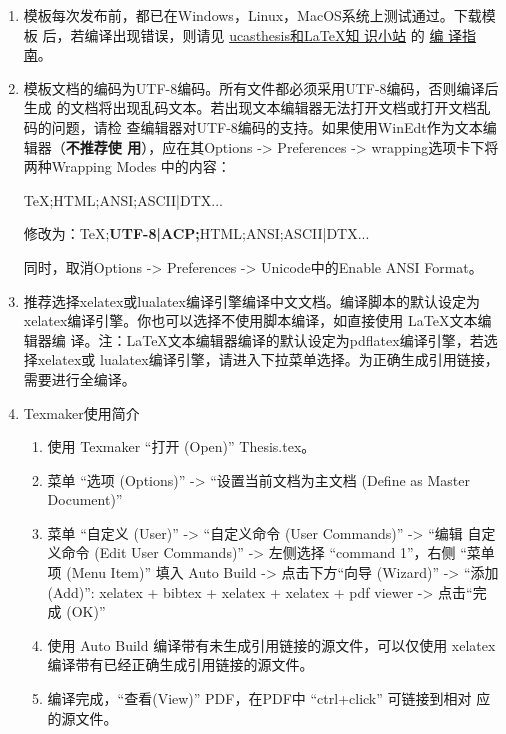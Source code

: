 \begin{enumerate}
    \item 模板每次发布前，都已在Windows，Linux，MacOS系统上测试通过。下载模板
    后，若编译出现错误，则请见
    \href{https://github.com/mohuangrui/ucasthesis/wiki}{ucasthesis和\LaTeX{}知
    识小站} 的
    \href{https://github.com/mohuangrui/ucasthesis/wiki/%E7%BC%96%E8%AF%91%E6%8C%87%E5%8D%97}{编
    译指南}。

    \item 模板文档的编码为UTF-8编码。所有文件都必须采用UTF-8编码，否则编译后生成
    的文档将出现乱码文本。若出现文本编辑器无法打开文档或打开文档乱码的问题，请检
    查编辑器对UTF-8编码的支持。如果使用WinEdt作为文本编辑器（\textbf{不推荐使
    用}），应在其Options -> Preferences -> wrapping选项卡下将两种Wrapping Modes
    中的内容：
        
        TeX;HTML;ANSI;ASCII|DTX...
        
        修改为：TeX;\textbf{UTF-8|ACP;}HTML;ANSI;ASCII|DTX...
        
        同时，取消Options -> Preferences -> Unicode中的Enable ANSI Format。

    \item 推荐选择xelatex或lualatex编译引擎编译中文文档。编译脚本的默认设定为
    xelatex编译引擎。你也可以选择不使用脚本编译，如直接使用 \LaTeX{}文本编辑器编
    译。注：\LaTeX{}文本编辑器编译的默认设定为pdflatex编译引擎，若选择xelatex或
    lualatex编译引擎，请进入下拉菜单选择。为正确生成引用链接，需要进行全编译。

    \item Texmaker使用简介
        \begin{enumerate}
            \footnotesize
            \item 使用 Texmaker “打开 (Open)” Thesis.tex。
            \item 菜单 “选项 (Options)” -> “设置当前文档为主文档 (Define as
            Master Document)”
            \item 菜单 “自定义 (User)” -> “自定义命令 (User Commands)” -> “编辑
            自定义命令 (Edit User Commands)” -> 左侧选择 “command 1”，右侧 “菜单
            项 (Menu Item)” 填入 Auto Build -> 点击下方“向导 (Wizard)” -> “添加
            (Add)”: xelatex + bibtex + xelatex + xelatex + pdf viewer -> 点击“完
            成 (OK)”
            \item 使用 Auto Build 编译带有未生成引用链接的源文件，可以仅使用
            xelatex 编译带有已经正确生成引用链接的源文件。
            \item 编译完成，“查看(View)” PDF，在PDF中 “ctrl+click” 可链接到相对
            应的源文件。
        \end{enumerate}
    

\end{enumerate}
